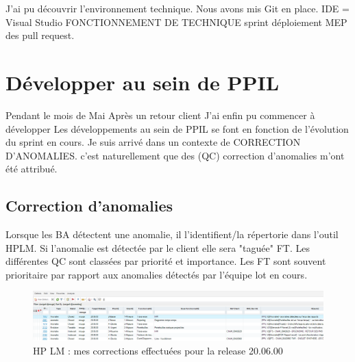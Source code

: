 J'ai pu découvrir l'environnement technique.
Nous avons mis Git en place.
IDE = Visual Studio
FONCTIONNEMENT DE TECHNIQUE sprint déploiement MEP des pull request.
\section{Développer au sein de PPIL}
Pendant le mois de Mai
Après un retour client 
J'ai enfin pu commencer à développer
Les développements au sein de PPIL se font en fonction de l'évolution du sprint en cours. Je suis arrivé dans un contexte de CORRECTION D'ANOMALIES. c'est naturellement que des (QC) correction d'anomalies m'ont été attribué.
\subsection{Correction d'anomalies}
Lorsque les BA détectent une anomalie, il l'identifient/la répertorie dans l'outil HPLM. Si l'anomalie est détectée par le client elle sera "taguée" FT.
Les différentes QC sont classées par priorité et importance.
Les FT sont souvent prioritaire par rapport aux anomalies détectés par l'équipe
lot en cours.
\begin{figure}[!h]
\centering
\includegraphics[width=1\textwidth]{images/HPLMliste.png}
\caption{HP LM : mes corrections effectuées pour la release 20.06.00}
\end{figure}
